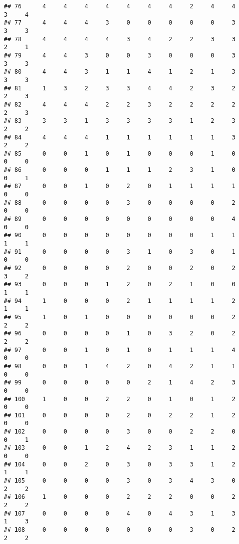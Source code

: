 \documentclass[
]{article}
\begin{document}
\begin{verbatim}
## 76      4     4     4     4     4     4     4     2     4     4     3     4
## 77      4     4     4     3     0     0     0     0     0     3     3     3
## 78      4     4     4     4     3     4     2     2     3     3     2     1
## 79      4     4     3     0     0     3     0     0     0     3     3     3
## 80      4     4     3     1     1     4     1     2     1     3     3     3
## 81      1     3     2     3     3     4     4     2     3     2     2     3
## 82      4     4     4     2     2     3     2     2     2     2     2     3
## 83      3     3     1     3     3     3     3     1     2     3     2     2
## 84      4     4     4     1     1     1     1     1     1     3     2     2
## 85      0     0     1     0     1     0     0     0     1     0     0     0
## 86      0     0     0     1     1     1     2     3     1     0     0     1
## 87      0     0     1     0     2     0     1     1     1     1     0     0
## 88      0     0     0     0     3     0     0     0     0     2     0     0
## 89      0     0     0     0     0     0     0     0     0     4     0     0
## 90      0     0     0     0     0     0     0     0     1     1     1     1
## 91      0     0     0     0     3     1     0     3     0     1     0     0
## 92      0     0     0     0     2     0     0     2     0     2     3     2
## 93      0     0     0     1     2     0     2     1     0     0     1     1
## 94      1     0     0     0     2     1     1     1     1     2     1     1
## 95      1     0     1     0     0     0     0     0     0     2     2     2
## 96      0     0     0     0     1     0     3     2     0     2     2     2
## 97      0     0     1     0     1     0     1     1     1     4     0     0
## 98      0     0     1     4     2     0     4     2     1     1     0     0
## 99      0     0     0     0     0     2     1     4     2     3     0     0
## 100     1     0     0     2     2     0     1     0     1     2     0     0
## 101     0     0     0     0     2     0     2     2     1     2     0     0
## 102     0     0     0     0     3     0     0     2     2     0     0     1
## 103     0     0     1     2     4     2     3     1     1     2     0     0
## 104     0     0     2     0     3     0     3     3     1     2     1     1
## 105     0     0     0     0     3     0     3     4     3     0     2     2
## 106     1     0     0     0     2     2     2     0     0     2     2     2
## 107     0     0     0     0     4     0     4     3     1     3     1     3
## 108     0     0     0     0     0     0     0     3     0     2     2     2

\end{verbatim}
\end{document}
